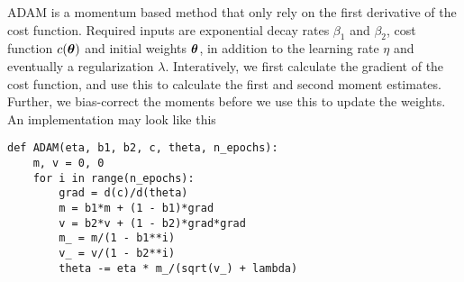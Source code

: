 ADAM is a momentum based method that only rely on the first derivative of the cost function. Required inputs are exponential decay rates $\beta_1$ and $\beta_2$, cost function $c(\boldsymbol{\theta})$ and initial weights $\boldsymbol{\theta}$, in addition to the learning rate $\eta$ and eventually a regularization $\lambda$. Interatively, we first calculate the gradient of the cost function, and use this to calculate the first and second moment estimates. Further, we bias-correct the moments before we use this to update the weights. An implementation may look like this
\lstset{basicstyle=\scriptsize}
\begin{lstlisting}
def ADAM(eta, b1, b2, c, theta, n_epochs):
    m, v = 0, 0
    for i in range(n_epochs):
        grad = d(c)/d(theta)
        m = b1*m + (1 - b1)*grad
        v = b2*v + (1 - b2)*grad*grad
        m_ = m/(1 - b1**i)
        v_ = v/(1 - b2**i)
        theta -= eta * m_/(sqrt(v_) + lambda)
\end{lstlisting}
